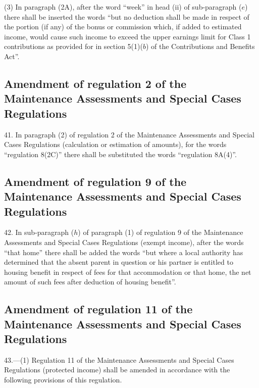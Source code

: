 \documentclass[a4paper]{article}
\begin{document}
(3) In paragraph (2A), after the word “week” in head (ii) of sub-paragraph ($e$) there shall be inserted the words “but no deduction shall be made in respect of the portion (if any) of the bonus or commission which, if added to estimated income, would cause such income to exceed the upper earnings limit for Class 1 contributions as provided for in section 5(1)($b$) of the Contributions and Benefits Act”.

\subsection[41. Amendment of regulation 2 of the Maintenance Assessments and Special Cases Regulations]{Amendment of regulation 2 of the Maintenance Assessments and Special Cases Regulations}

41.  In paragraph (2) of regulation 2 of the Maintenance Assessments and Special Cases Regulations (calculation or estimation of amounts), for the words “regulation 8(2C)” there shall be substituted the words “regulation 8A(4)”.

\subsection[42. Amendment of regulation 9 of the Maintenance Assessments and Special Cases Regulations]{Amendment of regulation 9 of the Maintenance Assessments and Special Cases Regulations}

42.  In sub-paragraph ($h$) of paragraph (1) of regulation 9 of the Maintenance Assessments and Special Cases Regulations (exempt income), after the words “that home” there shall be added the words “but where a local authority has determined that the absent parent in question or his partner is entitled to housing benefit in respect of fees for that accommodation or that home, the net amount of such fees after deduction of housing benefit”.

\subsection[43. Amendment of regulation 11 of the Maintenance Assessments and Special Cases Regulations]{Amendment of regulation 11 of the Maintenance Assessments and Special Cases Regulations}

43.—(1) Regulation 11 of the Maintenance Assessments and Special Cases Regulations (protected income) shall be amended in accordance with the following provisions of this regulation.
\end{document}
